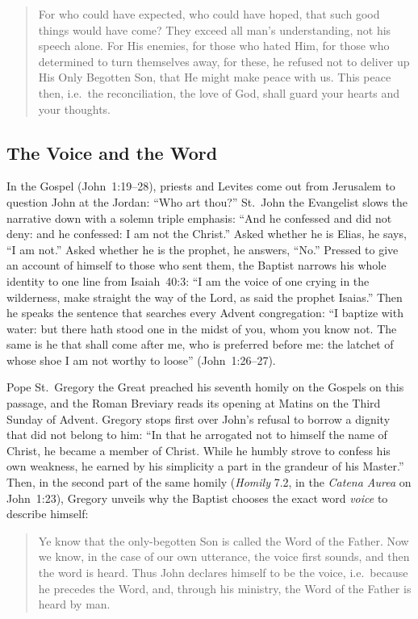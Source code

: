 \begin{quote}
For who could have expected, who could have hoped, that such good
things would have come? They exceed all man's understanding, not his
speech alone. For His enemies, for those who hated Him, for those who
determined to turn themselves away, for these, he refused not to deliver
up His Only Begotten Son, that He might make peace with us. This peace
then, i.e.\ the reconciliation, the love of God, shall guard your hearts
and your thoughts.
\end{quote}

\subsection{The Voice and the Word}

In the Gospel (John~1:19--28), priests and Levites come out from
Jerusalem to question John at the Jordan: ``Who art thou?'' St.~John
the Evangelist slows the narrative down with a solemn triple emphasis:
``And he confessed and did not deny: and he confessed: I am not the
Christ.'' Asked whether he is Elias, he says, ``I am not.'' Asked
whether he is the prophet, he answers, ``No.'' Pressed to give an
account of himself to those who sent them, the Baptist narrows his whole
identity to one line from Isaiah~40:3: ``I am the voice of one crying in
the wilderness, make straight the way of the Lord, as said the prophet
Isaias.'' Then he speaks the sentence that searches every Advent
congregation: ``I baptize with water: but there hath stood one in the
midst of you, whom you know not. The same is he that shall come after
me, who is preferred before me: the latchet of whose shoe I am not
worthy to loose'' (John~1:26--27).

Pope St.~Gregory the Great preached his seventh homily on the Gospels
on this passage, and the Roman Breviary reads its opening at Matins on
the Third Sunday of Advent. Gregory stops first over John's refusal to
borrow a dignity that did not belong to him: ``In that he arrogated not
to himself the name of Christ, he became a member of Christ. While he
humbly strove to confess his own weakness, he earned by his simplicity a
part in the grandeur of his Master.'' Then, in the second part of the
same homily (\textit{Homily} 7.2, in the \textit{Catena Aurea} on
John~1:23), Gregory unveils why the Baptist chooses the exact word
\textit{voice} to describe himself:

\begin{quote}
Ye know that the only-begotten Son is called the Word of the Father.
Now we know, in the case of our own utterance, the voice first sounds,
and then the word is heard. Thus John declares himself to be the voice,
i.e.\ because he precedes the Word, and, through his ministry, the Word
of the Father is heard by man.
\end{quote}

